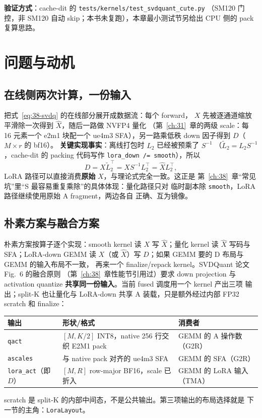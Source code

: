 \textbf{验证方式}：cache-dit 的 \texttt{tests/kernels/test\_svdquant\_cute.py}
（SM120 门控，非 SM120 自动 skip；本书未复跑），本章最小测试节另给出
CPU 侧的 pack 复算思路。

\section{问题与动机}

\subsection{在线侧两次计算，一份输入}

把式~\ref{eq:38-svdq} 的在线部分展开成数据流：每个 forward，
$X$ 先被逐通道缩放平滑除一次得到 $\widehat X$，随后一路做 NVFP4 量化
（第~\ref{ch:31}~章的两级 scale：每 16 元素一个 e2m1 块配一个 ue4m3
SFA），另一路乘低秩 down 因子得到 $D$（$M\times r$ 的 bf16）。
\textbf{关键实现事实}：离线打包时 $L_2$ 已经被预乘了 $S^{-1}$
（$\widetilde L_2=L_2S^{-1}$，cache-dit 的 packing 代码写作
\texttt{lora\_down /= smooth}），所以
\begin{equation}
  D=X\widetilde L_2^{\top}=XS^{-1}L_2^{\top}=\widehat XL_2^{\top},
  \label{eq:39-d}
\end{equation}
LoRA 路径可以直接消费\textbf{原始} $X$，与理论式完全一致。这正是
第~\ref{ch:38}~章“常见坑”里“S 最容易重复乘除”的具体体现：量化路径只对
临时副本除 \texttt{smooth}，LoRA 路径继续使用原始 A fragment，两边各自
正确、互为镜像。

\subsection{朴素方案与融合方案}

朴素方案按算子逐个实现：smooth kernel 读 $X$ 写 $\widehat X$；量化
kernel 读 $\widehat X$ 写码与 SFA；LoRA-down GEMM 读 $X$（或
$\widehat X$）写 $D$；如果 GEMM 要的 D 布局与 GEMM 的输入布局不一致，
再来一个 finalize/repack kernel。SVDQuant 论文 Fig.~6 的融合原则
（第~\ref{ch:38}~章性能节引用过）要求 down projection 与 activation
quantize \textbf{共享同一份输入}。当前 fused 调度用一个 kernel 产出三项
输出；split-K 也让量化与 LoRA-down 共享 A 装载，只是额外经过内部 FP32
scratch 和 finalize：
\begin{center}\small
\begin{tabular}{@{}lll@{}}
\toprule
输出 & 形状/格式 & 消费者 \\
\midrule
\texttt{qact} & $[M,K/2]$ INT8，native 256 行交织 E2M1 pack & GEMM 的 A 操作数（G2R）\\
\texttt{ascales} & 与 native pack 对齐的 ue4m3 SFA & GEMM 的 SFA（G2R）\\
\texttt{lora\_act}（即 $D$） & $[M,R]$ row-major BF16，scale 已折入 & GEMM 的 LoRA 输入（TMA）\\
\bottomrule
\end{tabular}
\end{center}
scratch 是 split-K 的内部中间态，不是公共输出。第三项输出的布局选择就是
下一节的主角：\texttt{LoraLayout}。

